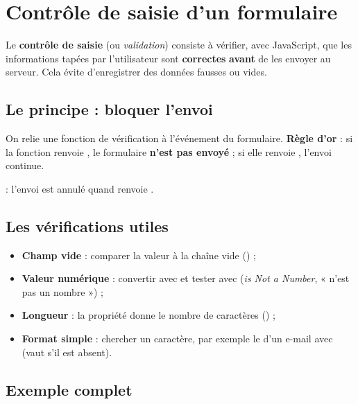 \section{Contrôle de saisie d'un formulaire}

\begin{definition}
Le \textbf{contrôle de saisie} (ou \emph{validation}) consiste à vérifier, avec
JavaScript, que les informations tapées par l'utilisateur sont \textbf{correctes}
\textbf{avant} de les envoyer au serveur. Cela évite d'enregistrer des données
fausses ou vides.
\end{definition}

\subsection{Le principe : bloquer l'envoi}

On relie une fonction de vérification à l'événement  du formulaire.
\textbf{Règle d'or} : si la fonction renvoie , le formulaire
\textbf{n'est pas envoyé} ; si elle renvoie , l'envoi continue.

\begin{syntaxe}
 : l'envoi est annulé quand
 renvoie .
\end{syntaxe}

\subsection{Les vérifications utiles}

\begin{itemize}
  \item \textbf{Champ vide} : comparer la valeur à la chaîne vide
        () ;
  \item \textbf{Valeur numérique} : convertir avec  et tester
        avec  (\emph{is Not a Number}, « n'est pas un nombre ») ;
  \item \textbf{Longueur} : la propriété  donne le nombre de
        caractères () ;
  \item \textbf{Format simple} : chercher un caractère, par exemple le 
        d'un e-mail avec  (vaut  s'il est absent).
\end{itemize}

\subsection{Exemple complet}

